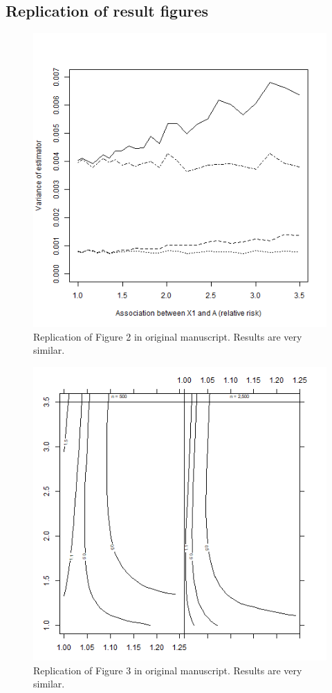 \documentclass[10,a4paperpaper,]{article}
\begin{document}
\subsection{Replication of result figures}

\begin{figure}
\includegraphics[width=450pt]{../analysis/figures/Figure2} \caption{Replication of Figure 2 in original manuscript. Results are very similar.}\label{fig:unnamed-chunk-1}
\end{figure}
\begin{figure}
\includegraphics[width=450pt]{../analysis/figures/Figure3} \caption{Replication of Figure 3 in original manuscript. Results are very similar.}\label{fig:unnamed-chunk-2}
\end{figure}
\end{document}
